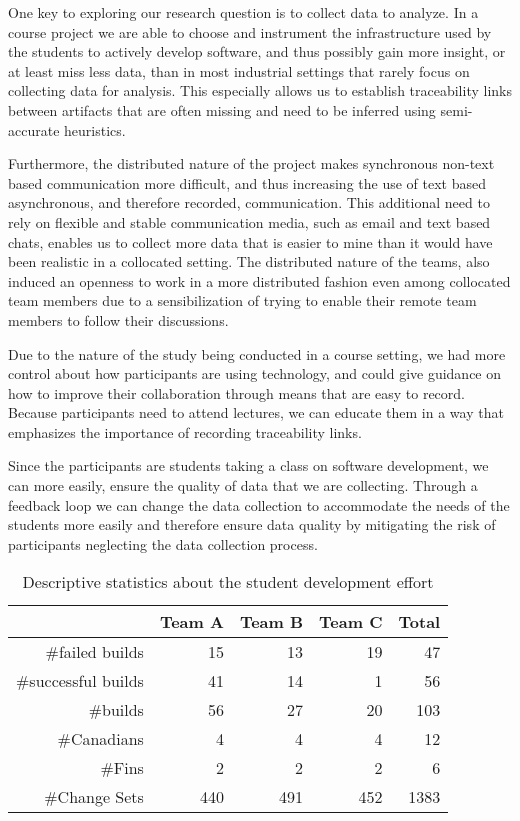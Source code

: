 One key to exploring our research question is to collect data to analyze.
In a course project we are able to choose and instrument the infrastructure used by the students to actively develop software, and thus possibly gain more insight, or at least miss less data, than in most industrial settings that rarely focus on collecting data for analysis.
This especially allows us to establish traceability links between artifacts that are often missing and need to be inferred using semi-accurate heuristics.

Furthermore, the distributed nature of the project makes synchronous non-text based communication more difficult, and thus increasing the use of text based asynchronous, and therefore recorded, communication.
This additional need to rely on flexible and stable communication media, such as email and text based chats, enables us to collect more data that is easier to mine than it would have been realistic in a collocated setting.
The distributed nature of the teams, also induced an openness to work in a more distributed fashion even among collocated team members due to a sensibilization of trying to enable their remote team members to follow their discussions.

Due to the nature of the study being conducted in a course setting, we had more control about how participants are using technology, and could give guidance on how to improve their collaboration through means that are easy to record.
Because participants need to attend lectures, we can educate them in a way that emphasizes the importance of recording traceability links.

Since the participants are students taking a class on software development, we can more easily, ensure the quality of data that we are collecting.
Through a feedback loop we can change the data collection to accommodate the needs of the students more easily and therefore ensure data quality by mitigating the risk of participants neglecting the data collection process. 

\begin{table}[t]
\centering
\caption{Descriptive statistics about the student development effort}
\begin{tabular}{rrrrr}
\toprule
& Team A & Team B & Team C & Total\\
\midrule
\#failed builds &15&13&19&47\\
\#successful builds &41&14&1&56\\ 
\#builds & 56 & 27 & 20 & 103 \\
\#Canadians & 4 & 4 & 4 & 12\\
\#Fins & 2 & 2 & 2 & 6\\
\#Change Sets & 440 & 491 &  452& 1383\\
\bottomrule
\end{tabular}
\label{tab:gsd:desc:stats}
\vspace{-5pt}
\end{table}

